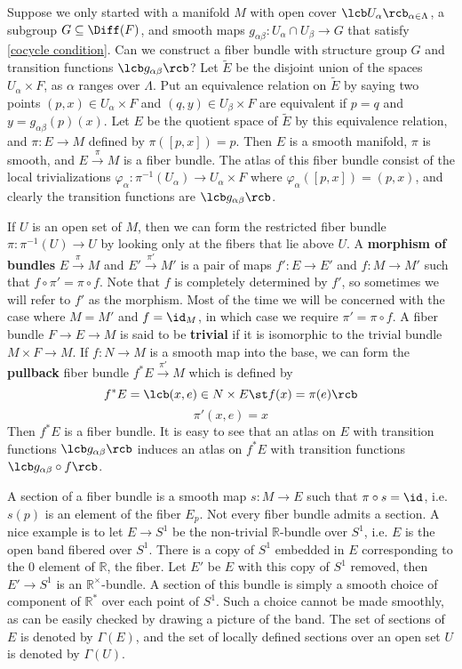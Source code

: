 Suppose we only started with a manifold $M$ with open cover $\lcb U_\alpha \rcb_{\alpha \in \Lambda}$, a subgroup $G \subseteq \Diff(F)$, and smooth maps $g_{\alpha\beta} : U_\alpha \cap U_\beta \rightarrow G$ that satisfy \eqref{cocycle condition}. Can we construct a fiber bundle with structure group $G$ and transition functions $\lcb g_{\alpha\beta} \rcb$? Let $\tilde{E}$ be the disjoint union of the spaces $U_\alpha \times F$, as $\alpha$ ranges over $\Lambda$. Put an equivalence relation on $\tilde{E}$ by saying two points $(p,x) \in U_\alpha \times F$ and $(q,y) \in U_\beta \times F$ are equivalent if $p=q$ and $y = g_{\alpha\beta}(p)(x)$. Let $E$ be the quotient space of $\tilde{E}$ by this equivalence relation, and $\pi : E \rightarrow M$ defined by $\pi([p,x]) = p$. Then $E$ is a smooth manifold, $\pi$ is smooth, and $E \stackrel{\pi}{\rightarrow} M$ is a fiber bundle. The atlas of this fiber bundle consist of the local trivializations $\varphi_\alpha : \pi^{-1}(U_\alpha) \rightarrow U_\alpha \times F$ where $\varphi_\alpha([p,x]) = (p,x)$, and clearly the transition functions are $\lcb g_{\alpha\beta} \rcb$. 

If $U$ is an open set of $M$, then we can form the restricted fiber bundle $\pi : \pi^{-1}(U) \rightarrow U$ by looking only at the fibers that lie above $U$. A \textbf{morphism of bundles} $E \stackrel{\pi}{\rightarrow} M$ and $E' \stackrel{\pi'}{\rightarrow} M'$ is a pair of maps $f' : E \rightarrow E'$ and $f : M \rightarrow M'$ such that $f \circ \pi' = \pi \circ f$. Note that $f$ is completely determined by $f'$, so sometimes we will refer to $f'$ as the morphism. Most of the time we will be concerned with the case where $M=M'$ and $f=\id_M$, in which case we require $\pi' = \pi \circ f$. A fiber bundle $F \rightarrow E \rightarrow M$ is said to be \textbf{trivial} if it is isomorphic to the trivial bundle $M \times F \rightarrow M$. If $f : N \rightarrow M$ is a smooth map into the base, we can form the \textbf{pullback} fiber bundle $f^*E \stackrel{\pi'} \rightarrow M$ which is defined by
\[ f^*E = \lcb (x,e) \in N \times E \st f(x) = \pi(e) \rcb \]
\[ \pi'(x,e) = x \]
Then $f^*E$ is a fiber bundle. It is easy to see that an atlas on $E$ with transition functions $\lcb g_{\alpha\beta} \rcb$ induces an atlas on $f^*E$ with transition functions $\lcb g_{\alpha\beta} \circ f \rcb$. 


A section of a fiber bundle is a smooth map $s : M \rightarrow E$ such that $\pi \circ s = \id$, i.e. $s(p)$ is an element of the fiber $E_p$. Not every fiber bundle admits a section. A nice example is to let $E \rightarrow S^1$ be the non-trivial $\mathbb R$-bundle over $S^1$, i.e. $E$ is the open \Mobius band fibered over $S^1$. There is a copy of $S^1$ embedded in $E$ corresponding to the 0 element of $\mathbb R$, the fiber. Let $E'$ be $E$ with this copy of $S^1$ removed, then $E' \rightarrow S^1$ is an $\mathbb R^\times$-bundle. A section of this bundle is simply a smooth choice of component of $\mathbb R^*$ over each point of $S^1$. Such a choice cannot be made smoothly, as can be easily checked by drawing a picture of the \Mobius band. The set of sections of $E$ is denoted by $\Gamma(E)$, and the set of locally defined sections over an open set $U$ is denoted by $\Gamma(U)$. 

